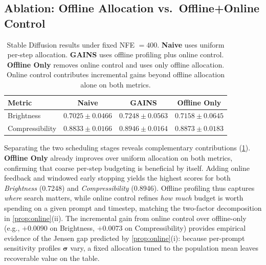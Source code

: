 \subsection{Ablation: Offline Allocation vs.\ Offline+Online Control}
\label{sec:exp-ablation-offline-online}
\begin{table}[t]
\centering
\caption{Stable Diffusion results under fixed NFE $=400$.
\textbf{Naive} uses uniform per-step allocation.
\textbf{GAINS} uses offline profiling plus online control.
\textbf{Offline Only} removes online control and uses only offline allocation.
Online control contributes incremental gains beyond offline allocation alone on both metrics.}
\label{tab:sd_400_ablation}
\begin{tabular}{lccc}
\toprule
\textbf{Metric} & \textbf{Naive} & \textbf{GAINS} & \textbf{Offline Only} \\
\midrule
Brightness        & $0.7025 \pm 0.0466$ & $\mathbf{0.7248 \pm 0.0563}$ & $0.7158 \pm 0.0645$ \\
Compressibility   & $0.8833 \pm 0.0166$ & $\mathbf{0.8946 \pm 0.0164}$ & $0.8873 \pm 0.0183$ \\
\bottomrule
\end{tabular}
\end{table}

Separating the two scheduling stages reveals complementary contributions (\cref{tab:sd_400_ablation}).
\textbf{Offline Only} already improves over uniform allocation on both metrics, confirming that coarse per-step budgeting is beneficial by itself.
Adding online feedback and windowed early stopping yields the highest scores for both \textit{Brightness} (0.7248) and \textit{Compressibility} (0.8946).
Offline profiling thus captures \emph{where} search matters, while online control refines \emph{how much} budget is worth spending on a given prompt and timestep, matching the two-factor decomposition in \cref{prop:online}(ii).
The incremental gain from online control over offline-only (e.g., $+0.0090$ on Brightness, $+0.0073$ on Compressibility) provides empirical evidence of the Jensen gap predicted by \cref{prop:online}(i): because per-prompt sensitivity profiles $\boldsymbol{\sigma}$ vary, a fixed allocation tuned to the population mean leaves recoverable value on the table.

